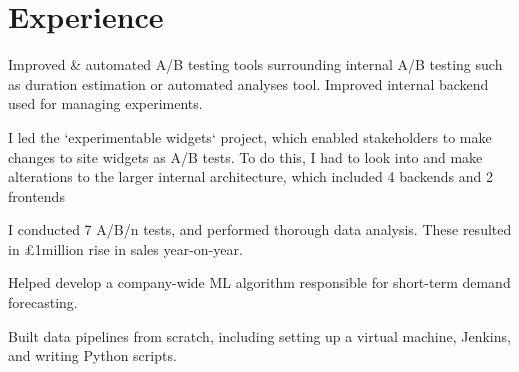 \documentclass[]{CV}
\begin{document}
%
%


%
%

\begin{minipage}[t]{0.705\textwidth} 



\section{Experience}
\vspace{\topsep} %
\quad
\begin{tightemize}

\item Improved \& automated A/B testing tools surrounding internal A/B testing such as duration estimation or automated analyses tool. Improved internal backend used for managing experiments.

\item I led the `experimentable widgets` project, which enabled stakeholders to make changes to site widgets as A/B tests. To do this, I had to look into and make alterations to the larger internal architecture, which included 4 backends and 2 frontends

\item I conducted 7 A/B/n tests, and performed thorough data analysis. These resulted in £1million rise in sales year-on-year.

\item Helped develop a company-wide ML algorithm responsible for short-term demand forecasting.

\item Built data pipelines from scratch, including setting up a virtual machine, Jenkins, and writing Python scripts.


\end{tightemize}
\end{minipage}
\end{document}
